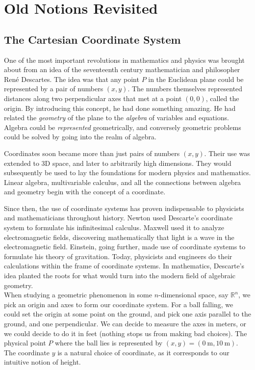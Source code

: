 \documentclass[../master.tex]{subfiles}
\begin{document}
\chapter{Old Notions Revisited}\thispagestyle{empty}
\section{The Cartesian Coordinate System} %
\label{sec:Cartesian}
	
	One of the most important revolutions in mathematics and physics was brought about from an idea of the seventeenth century mathematician and philosopher Ren\'{e} Descartes. The idea was that any point $P$ in the Euclidean plane could be represented by a pair of numbers $(x,y)$. The numbers themselves represented distances along two perpendicular axes that met at a point $(0,0)$, called the origin. By introducing this concept, he had done something amazing. He had related the \emph{geometry} of the plane to the \emph{algebra} of variables and equations. Algebra could be \emph{represented} geometrically, and conversely geometric problems could be solved by going into the realm of algebra.
	
	
	Coordinates soon became more than just pairs of numbers $(x,y)$. Their use was extended to 3D space, and later to arbitrarily high dimensions. They would subsequently be used to lay the foundations for modern physics and mathematics. Linear algebra, multivariable calculus, and all the connections between algebra and geometry begin with the concept of a coordinate.
	
	Since then, the use of coordinate systems has proven indispensable to physicists and mathematicians throughout history. Newton used Descarte's coordinate system to formulate his infinitesimal calculus. Maxwell used it to analyze electromagnetic fields, discovering mathematically that light is a wave in the electromagnetic field. Einstein, going further, made use of coordinate systems to formulate his theory of gravitation. Today, physicists and engineers do their calculations within the frame of coordinate systems. In mathematics, Descarte's idea planted the roots for what would turn into the modern field of algebraic geometry. \\
	
	When studying a geometric phenomenon in some $n$-dimensional space, say $\mathbb{R}^n$, we pick an origin and axes to form our coordinate system. For a ball falling, we could set the origin at some point on the ground, and pick one axis parallel to the ground, and one perpendicular. We can decide to measure the axes in meters, or we could decide to do it in feet (nothing stops us from making bad choices). The physical point $P$ where the ball lies is represented by $(x,y)=(0~ \mathrm m,10~ \mathrm m)$. The coordinate $y$ is a natural choice of coordinate, as it corresponds to our intuitive notion of height. 
	
\end{document}

